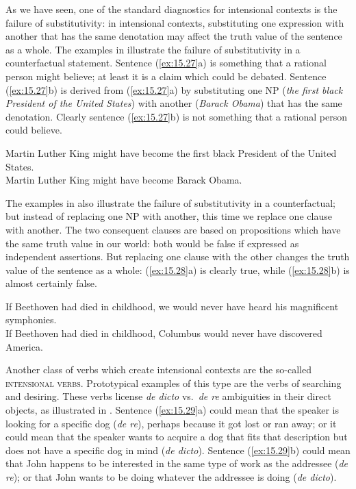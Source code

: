 As we have seen, one of the standard diagnostics for intensional contexts is the failure of substitutivity: in intensional contexts, substituting one expression with another that has the same denotation may affect the truth value of the sentence as a whole. The examples in  illustrate the failure of substitutivity in a counterfactual statement. Sentence (\ref{ex:15.27}a) is something that a rational person might believe; at least it is a claim which could be debated. Sentence (\ref{ex:15.27}b) is derived from (\ref{ex:15.27}a) by substituting one NP (\textit{the first black President of the United States}) with another (\textit{Barack Obama}) that has the same denotation. Clearly sentence (\ref{ex:15.27}b) is not something that a rational person could believe.


\ea \label{ex:15.27}
\ea  Martin Luther King might have become the first black President of the United States.\\
\ex Martin Luther King might have become Barack Obama.
                       \z
\z


The examples in  also illustrate the failure of substitutivity in a counterfactual; but instead of replacing one NP with another, this time we replace one clause with another. The two consequent clauses are based on propositions which have the same truth value in our world: both would be false if expressed as independent assertions. But replacing one clause with the other changes the truth value of the sentence as a whole: (\ref{ex:15.28}a) is clearly true, while (\ref{ex:15.28}b) is almost certainly false.


\ea \label{ex:15.28}
\ea  If Beethoven had died in childhood, we would never have heard his magnificent symphonies.\\
\ex If Beethoven had died in childhood, Columbus would never have discovered America.
                       \z
\z


Another class of verbs which create intensional contexts are the so-called \textsc{intensional verbs}. Prototypical examples of this type are the verbs of searching and desiring. These verbs license \textit{de dicto} vs.~\textit{de re} ambiguities in their direct objects, as illustrated in . Sentence (\ref{ex:15.29}a) could mean that the speaker is looking for a specific dog (\textit{de re}), perhaps because it got lost or ran away; or it could mean that the speaker wants to acquire a dog that fits that description but does not have a specific dog in mind (\textit{de dicto}). Sentence (\ref{ex:15.29}b) could mean that John happens to be interested in the same type of work as the addressee (\textit{de re}); or that John wants to be doing whatever the addressee is doing (\textit{de dicto}).


